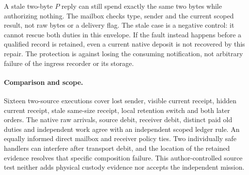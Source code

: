 \documentclass[11pt]{article}
\begin{document}
A stale two-byte \(P\) reply can still spend exactly the same
two bytes while authorizing nothing. The mailbox checks type,
sender and the current scoped result, not raw bytes or a
delivery flag. The stale case is a negative control:
it cannot rescue both duties in this envelope. If the fault
instead happens before a qualified record is retained, even
a current native deposit is not recovered by this repair.
The protection is against losing the consuming notification,
not arbitrary failure of the ingress recorder or its storage.

\paragraph{Comparison and scope.}
Sixteen two-source executions cover lost sender, visible current
receipt, hidden current receipt, stale same-size receipt, local
retention switch and both later orders. The native raw arrivals,
source debit, receiver debit, distinct paid old duties and
independent work agree with an independent scoped ledger rule.
An equally informed direct mailbox and receiver policy ties.
Two individually safe handlers can interfere after transport
debit, and the location of the retained evidence resolves that
specific composition failure. This author-controlled source
test neither adds physical custody evidence nor accepts the
independent mission.
\end{document}

